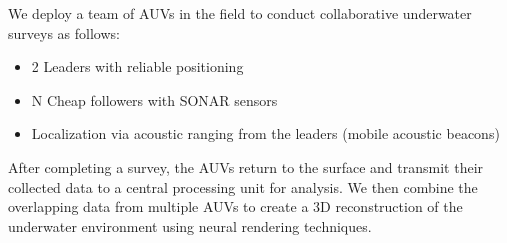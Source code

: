 
We deploy a team of AUVs in the field to conduct collaborative underwater surveys as follows:

\begin{tcolorbox}[colback=wasppink!10, colframe=wasppink, boxrule=0.5pt]
\begin{itemize}[leftmargin=1em, itemsep=0.05em]
    \item 2 Leaders with reliable positioning
    \item N Cheap followers with SONAR sensors
    \item Localization via acoustic ranging from the leaders (mobile acoustic beacons)
\end{itemize}
\end{tcolorbox}

After completing a survey, the AUVs return to the surface and transmit their collected data to a central processing unit for analysis. We then combine the overlapping data from multiple AUVs to create a 3D reconstruction of the underwater environment using neural rendering techniques.



